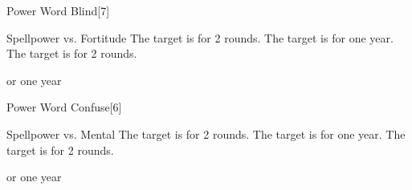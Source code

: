 \begin{spellsection}{Power Word Blind}[7]
    \begin{spellheader}
    \end{spellheader}
    \begin{spellcontent}
        \begin{spelltargetinginfo}
        \end{spelltargetinginfo}
        \begin{spelleffects}
            \begin{spellattack}{Spellpower vs. Fortitude}
                \spellsuccess The target is \blinded for 2 rounds.
                \spellcritical The target is \blinded for one year.
                \spellfailure The target is \partiallyblinded for 2 rounds.
            \end{spellattack}
            \spelldur \durbrief or one year
        \end{spelleffects}
    \end{spellcontent}
    \begin{spellfooter}
        \miscastrandom
    \end{spellfooter}
\end{spellsection}

\begin{spellsection}{Power Word Confuse}[6]
    \begin{spellheader}
    \end{spellheader}
    \begin{spellcontent}
        \begin{spelltargetinginfo}
        \end{spelltargetinginfo}
        \begin{spelleffects}
            \begin{spellattack}{Spellpower vs. Mental}
                \spellsuccess The target is \confused for 2 rounds.
                \spellcritical The target is \confused for one year.
                \spellfailure The target is \disoriented for 2 rounds.
            \end{spellattack}
            \spelldur \durbrief or one year
        \end{spelleffects}
    \end{spellcontent}
    \begin{spellfooter}
        \miscastrandom
    \end{spellfooter}
\end{spellsection}

